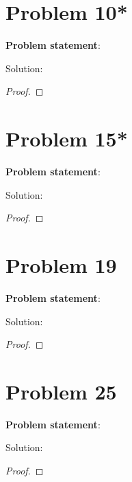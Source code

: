\documentclass{article} %
\begin{document}
\section*{Problem 10*}


\textbf{Problem statement}: 

Solution: 
\begin{addmargin}[1em]{0em}
\begin{proof}

\end{proof}
\end{addmargin}

\newpage

\section*{Problem 15*}


\textbf{Problem statement}: 

Solution: 
\begin{addmargin}[1em]{0em}
\begin{proof}

\end{proof}
\end{addmargin}

\newpage

\section*{Problem 19}


\textbf{Problem statement}: 

Solution: 
\begin{addmargin}[1em]{0em}
\begin{proof}

\end{proof}
\end{addmargin}

\newpage

\section*{Problem 25}


\textbf{Problem statement}: 

Solution: 
\begin{addmargin}[1em]{0em}
\begin{proof}

\end{proof}
\end{addmargin}
\end{document}
